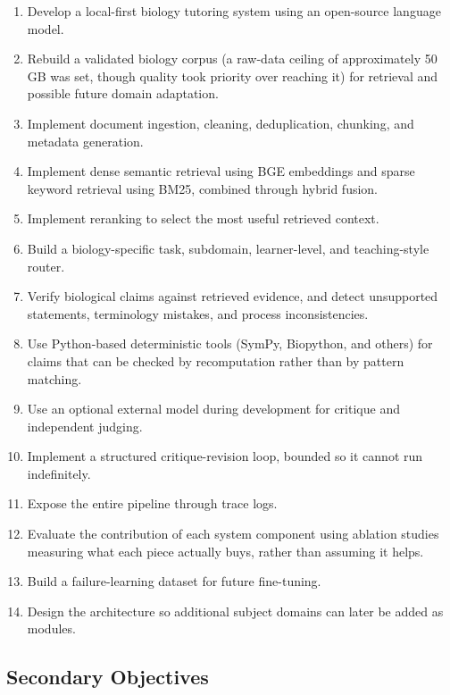 \begin{enumerate}
    \item Develop a local-first biology tutoring system using an
        open-source language model.
    \item Rebuild a validated biology corpus (a raw-data ceiling of
        approximately 50\,GB was set, though quality took priority over
        reaching it) for retrieval and possible future domain adaptation.
    \item Implement document ingestion, cleaning, deduplication, chunking,
        and metadata generation.
    \item Implement dense semantic retrieval using BGE embeddings and
        sparse keyword retrieval using BM25, combined through hybrid
        fusion.
    \item Implement reranking to select the most useful retrieved context.
    \item Build a biology-specific task, subdomain, learner-level, and
        teaching-style router.
    \item Verify biological claims against retrieved evidence, and detect
        unsupported statements, terminology mistakes, and process
        inconsistencies.
    \item Use Python-based deterministic tools (SymPy, Biopython, and
        others) for claims that can be checked by recomputation rather than
        by pattern matching.
    \item Use an optional external model during development for critique
        and independent judging.
    \item Implement a structured critique-revision loop, bounded so it
        cannot run indefinitely.
    \item Expose the entire pipeline through trace logs.
    \item Evaluate the contribution of each system component using
        ablation studies measuring what each piece actually buys, rather
        than assuming it helps.
    \item Build a failure-learning dataset for future fine-tuning.
    \item Design the architecture so additional subject domains can later
        be added as modules.
\end{enumerate}

\subsection{Secondary Objectives}\label{1.4.2}

